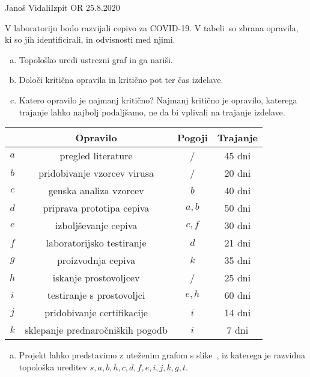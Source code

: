 \begin{naloga}{Janoš Vidali}{Izpit OR 25.8.2020}
\begin{vprasanje}
V laboratoriju bodo razvijali cepivo za COVID-19.
V tabeli~\tab so zbrana opravila, ki so jih identificirali,
 in odvisnosti med njimi.
\begin{enumerate}[(a)]
\item Topološko uredi ustrezni graf in ga nariši.
\item Določi kritična opravila in kritično pot ter čas izdelave.
\item Katero opravilo je najmanj kritično?
Najmanj kritično je opravilo,
katerega trajanje lahko najbolj podaljšamo,
ne da bi vplivali na trajanje izdelave.
\end{enumerate}

\begin{tabela}
\begin{tabular}{c|ccc}
    & Opravilo                         & Pogoji & Trajanje \\ \hline
$a$ & pregled literature               & /      & 45 dni \\
$b$ & pridobivanje vzorcev virusa      & /      & 20 dni \\
$c$ & genska analiza vzorcev           & $b$    & 40 dni \\
$d$ & priprava prototipa cepiva        & $a, b$ & 50 dni \\
$e$ & izboljševanje cepiva             & $c, f$ & 30 dni \\
$f$ & laboratorijsko testiranje        & $d$    & 21 dni \\
$g$ & proizvodnja cepiva               & $k$    & 35 dni \\
$h$ & iskanje prostovoljcev            & /      & 25 dni \\
$i$ & testiranje s prostovoljci        & $e, h$ & 60 dni \\
$j$ & pridobivanje certifikacije       & $i$    & 14 dni \\
$k$ & sklepanje prednaročniških pogodb & $i$    &  7 dni
\end{tabular}
\end{tabela}
\end{vprasanje}

\begin{odgovor}
\begin{enumerate}[(a)]
\item Projekt lahko predstavimo z uteženim grafom s slike~\fig,
iz katerega je raz\-vid\-na topološka ureditev
$s, a, b, h, c, d, f, e, i, j, k, g, t$.


\end{enumerate}
\end{odgovor}
\end{naloga}
